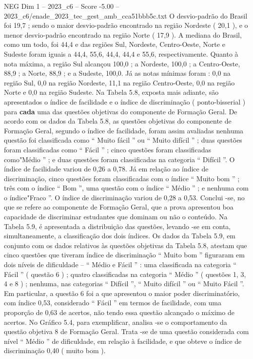 \begin{textsample}{NEG Dim 1 – 2023\_c6 – Score -5.00 – 2023\_c6/enade\_2023\_tec\_gest\_amb\_cca51bbb5c.txt}
O desvio-padrão do Brasil foi 19,7 ; sendo o maior desvio-padrão encontrado na região Nordeste ( 20,1 ), e o menor desvio-padrão encontrado na região Norte ( 17,9 ).
A mediana do Brasil, como um todo, foi 44,4 e das regiões Sul, Nordeste, Centro-Oeste, Norte e Sudeste foram iguais a 44,4, 55,6, 44,4, 44,4 e 55,6, respectivamente.
Quanto à nota máxima, a região Sul alcançou 100,0 ; a Nordeste, 100,0 ; a Centro-Oeste, 88,9 ; a Norte, 88,9 ; e a Sudeste, 100,0.
Já as notas mínimas foram : 0,0 na região Sul, 0,0 na região Nordeste, 11,1 na região Centro-Oeste, 0,0 na região Norte e 0,0 na região Sudeste.
Na Tabela 5.8, exposta mais adiante, são apresentados o índice de facilidade e o índice de discriminação ( ponto-bisserial ) para \textbf{cada} uma das questões objetivas do componente de Formação Geral.
De acordo com os dados da Tabela 5.8, as questões objetivas do componente de Formação Geral, segundo o índice de facilidade, foram assim avaliadas nenhuma questão foi classificada como “ Muito fácil ” ou “ Muito difícil ” ; duas questões foram classificadas como “ Fácil ” ; cinco questões foram classificadas como"Médio ” ; e duas questões foram classificadas na categoria “ Difícil ”.
O índice de facilidade variou de 0,26 a 0,78.
Já em relação ao índice de discriminação, cinco questões foram classificadas com o índice “ Muito bom ” ; três com o índice “ Bom ”, uma questão com o índice “ Médio ” ; e nenhuma com o índice"Fraco ”.
O índice de discriminação variou de 0,28 a 0,53.
Conclui -se, no que se refere ao componente de Formação Geral, que a prova apresentou boa capacidade de discriminar estudantes que dominam ou não o conteúdo.
Na Tabela 5.9, é apresentada a distribuição das questões, levando -se em conta, simultaneamente, a classificação dos dois índices.
Os dados da Tabela 5.9, em conjunto com os dados relativos às questões objetivas da Tabela 5.8, atestam que cinco questões que tiveram índice de discriminação “ Muito bom ” figuraram em dois níveis de dificuldade – “ Médio e Fácil ” : uma classificada na categoria “ Fácil ” ( questão 6 ) ; quatro classificadas na categoria “ Médio ” ( questões 1, 3, 4 e 8 ) ; nenhuma, nas categorias “ Difícil ”, “ Muito difícil ” ou “ Muito Fácil ”.
Em particular, a questão 6 foi a que apresentou o maior poder discriminatório, com índice 0,53, considerado “ Fácil ” em termos de facilidade, com uma proporção de 0,63 de acertos, não tendo essa questão alcançado o máximo de acertos.
No Gráfico 5.4, para exemplificar, analisa -se o comportamento da questão objetiva 8 de Formação Geral.
Trata -se de uma questão considerada com nível “ Médio ” de dificuldade, em relação à facilidade, e que obteve o índice de discriminação 0,40 ( muito bom ).

\end{textsample}
